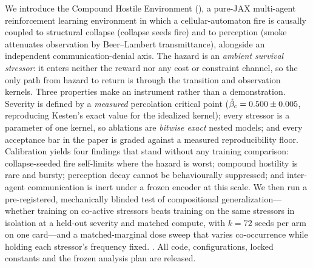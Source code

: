We introduce the Compound Hostile Environment (\CHE), a pure-JAX multi-agent
reinforcement learning environment in which a cellular-automaton fire is
causally coupled to structural collapse (collapse seeds fire) and to
perception (smoke attenuates observation by Beer--Lambert transmittance),
alongside an independent communication-denial axis. The hazard is an
\emph{ambient survival stressor}: it enters neither the reward nor any cost
or constraint channel, so the only path from hazard to return is through the
transition and observation kernels. Three properties make \CHE{} an
instrument rather than a demonstration. Severity is defined by a
\emph{measured} percolation critical point ($\hat\beta_c = 0.500 \pm 0.005$,
reproducing Kesten's exact value for the idealized kernel); every stressor is
a parameter of one kernel, so ablations are \emph{bitwise exact} nested
models; and every acceptance bar in the paper is graded against a measured
reproducibility floor. Calibration yields four findings that stand without
any training comparison: collapse-seeded fire self-limits where the hazard is
worst; compound hostility is rare and bursty; perception decay cannot be
behaviourally suppressed; and inter-agent communication is inert under a
frozen encoder at this scale. We then run a pre-registered, mechanically
blinded test of compositional generalization---whether training on co-active
stressors beats training on the same stressors in isolation at a held-out
severity and matched compute, with $k = 72$ seeds per arm on one card---and
a matched-marginal dose sweep that varies co-occurrence while holding each
stressor's frequency fixed. . All code, configurations, locked constants and the frozen analysis
plan are released.
